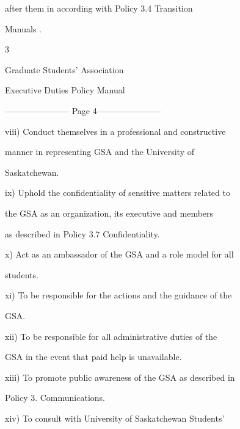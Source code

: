                   after   them   in   according   with   Policy   3.4   Transition  

                  Manuals .   

  



                                                  3  

                                      

                                    Graduate Students’ Association  

                                   Executive Duties Policy Manual  

  


----------------------- Page 4-----------------------

viii)    Conduct  themselves  in  a  professional  and  constructive  

         manner   in   representing   GSA   and   the   University   of  

         Saskatchewan.   

  

ix)      Uphold the confidentiality of sensitive matters related to  

         the GSA  as an organization, its  executive  and  members  

         as described in Policy 3.7 Confidentiality.   

  

x)       Act as an ambassador of the GSA and a role model for all  

         students.   

  

xi)      To be responsible for the actions and the guidance of the  

         GSA.   

  

  

xii)     To  be  responsible  for  all  administrative  duties  of  the  

         GSA in the event that paid help is unavailable.   

  

xiii)    To promote public awareness of the GSA as described in  



         Policy 3. Communications.   

  

xiv)     To  consult  with  University  of  Saskatchewan  Students’  


